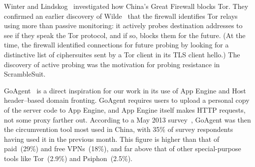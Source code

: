 \documentclass{article}
\begin{document}

Winter and Lindskog~\cite{foci12-winter} investigated how China's Great Firewall blocks Tor.
They confirmed an earlier discovery of Wilde~\cite{wilde} that the firewall identifies Tor relays using more than passive monitoring:
it actively probes destination addresses to see if they speak the Tor protocol, and if so,
blocks them for the future.
(At the time, the firewall identified connections for future probing by looking for a distinctive
list of ciphersuites sent by a Tor client in its TLS client hello.) %
The discovery of active probing was the motivation for probing resistance in ScrambleSuit.

GoAgent~\cite{goagent} is a direct inspiration for our work in its use of App
Engine and Host header--based domain fronting. GoAgent requires users to upload
a personal copy of the server code to App Engine, and App Engine itself makes
HTTP requests, not some proxy farther out. According to a May 2013 survey~\cite{collateral-freedom},
GoAgent was then the circumvention tool most used in
China, with 35\% of survey respondents having used it in the previous month.
This figure is higher than that of paid~(29\%) and free VPNs~(18\%), and far
above that of other special-purpose tools like Tor~(2.9\%) and Psiphon~(2.5\%).


  

\end{document}
